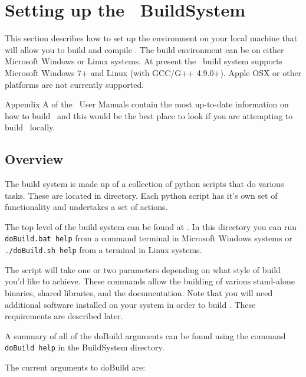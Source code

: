 \section{Setting up the \CNAME\ BuildSystem\label{sec:build_environment}}

This section describes how to set up the environment on your local machine that will allow you to build and compile \CNAME. The build environment can be on either Microsoft Windows or Linux systems. At present the \CNAME\ build system supports Microsoft Windows 7+ and Linux (with GCC/G++ 4.9.0+). Apple OSX or other platforms are not currently supported. 

Appendix A of the \CNAME\ User Manuals contain the most up-to-date information on how to build \CNAME\, and this would be the best place to look if you are attempting to build \CNAME\ locally.

\subsection{Overview}

The build system is made up of a collection of python scripts that do various tasks. These are located in  directory. Each python script has it's own set of functionality and undertakes a set of actions.

The top level of the build system can be found at . In this directory you can run \texttt{doBuild.bat help} from a command terminal in Microsoft Windows systems or \texttt{./doBuild.sh help} from a terminal in Linux systems.

The script will take one or two parameters depending on what style of build you'd like to achieve. These commands allow the building of various stand-alone binaries, shared libraries, and the documentation. Note that you will need additional software installed on your system in order to build \CNAME. These requirements are described later.

A summary of all of the doBuild arguments can be found using the command \texttt{doBuild help} in the BuildSystem directory.

The current arguments to doBuild are:

